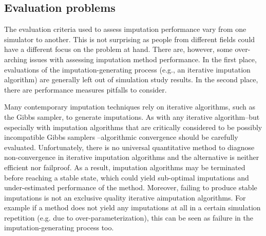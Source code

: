 \documentclass[bimj,fleqn]{w-art}
\begin{document}

\subsection{Evaluation problems}



The evaluation criteria used to assess imputation performance vary from one simulator to another. This is not surprising as people from different fields could have a different focus on the problem at hand. There are, however, some over-arching issues with assessing imputation method performance. In the first place, evaluations of the imputation-generating process (e.g., an iterative imputation algorithm) are generally left out of simulation study results. In the second place, there are performance measures pitfalls to consider.

Many contemporary imputation techniques rely on iterative algorithms, such as the Gibbs sampler, to generate imputations. As with any iterative algorithm--but especially with imputation algorithms that are critically considered to be possibly incompatible Gibbs samplers \citep[PIGS,][]{li2012imputing}--algorithmic convergence should be carefully evaluated. Unfortunately, there is no universal quantitative method to diagnose non-convergence in iterative imputation algorithms \citep{zhu15, ober21} and the alternative \citep[visual inspection of the imputation algorithm;][]{fimd} is neither efficient nor failproof. As a result, imputation algorithms may be terminated before reaching a stable state, which could yield sub-optimal imputations and under-estimated performance of the method. Moreover, failing to produce stable imputations is not an exclusive quality iterative aimputation algorithms. For example if a method does not yield any imputations at all in a certain simulation repetition (e.g. due to over-parameterization), this can be seen as failure in the imputation-generating process too. 
\end{document}
